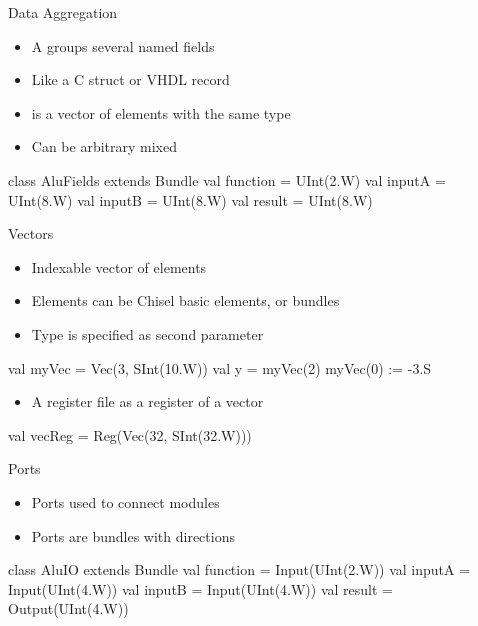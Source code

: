 \begin{frame}[fragile]{Data Aggregation}
\begin{itemize}
\item A  groups several named fields
\item Like a C struct or VHDL record
\item {} is a vector of elements with the same type
\item Can be arbitrary mixed
\end{itemize}
\begin{chisel}
class AluFields extends Bundle {
  val function = UInt(2.W)
  val inputA = UInt(8.W)
  val inputB = UInt(8.W)
  val result = UInt(8.W)
}
\end{chisel}
\end{frame}

\begin{frame}[fragile]{Vectors}
\begin{itemize}
\item Indexable vector of elements
\item Elements can be Chisel basic elements, or bundles
\item Type is specified as second parameter
\end{itemize}
\begin{chisel}
val myVec = Vec(3, SInt(10.W))
val y = myVec(2)
myVec(0) := -3.S
\end{chisel}
\begin{itemize}
\item A register file as a register of a vector
\end{itemize}
\begin{chisel}
val vecReg = Reg(Vec(32, SInt(32.W)))
\end{chisel}
\end{frame}

\begin{frame}[fragile]{Ports}
\begin{itemize}
\item Ports used to connect modules
\item Ports are bundles with directions
\end{itemize}
\begin{chisel}
class AluIO extends Bundle {
  val function = Input(UInt(2.W))
  val inputA = Input(UInt(4.W))
  val inputB = Input(UInt(4.W))
  val result = Output(UInt(4.W))
}
\end{chisel}
\end{frame}

